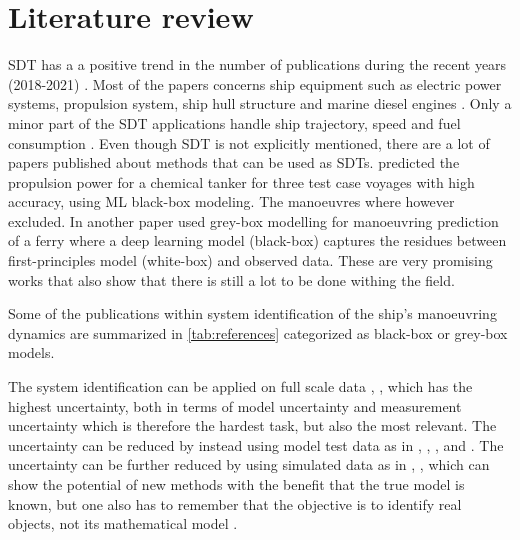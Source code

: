 

\section{Literature review}
SDT has a a positive trend in the number of publications during the recent years (2018-2021)  \cite{assani_ships_2022}. Most of the papers concerns ship equipment such as electric power systems, propulsion system, ship hull structure and marine diesel engines \cite{assani_ships_2022}. Only a minor part of the SDT applications handle ship trajectory, speed and fuel consumption \cite{assani_ships_2022}.   
Even though SDT is not explicitly mentioned, there are a lot of papers published about methods that can be used as SDTs. \cite{lang_comparison_2022} predicted the propulsion power for a chemical tanker for three test case voyages with high accuracy, using ML black-box modeling. The manoeuvres where however excluded. In another paper \cite{nielsen_machine_2022} used grey-box modelling for manoeuvring prediction of a ferry where a deep learning model (black-box) captures the residues between first-principles model (white-box) and observed data. These are very promising works that also show that there is still a lot to be done withing the field. 

Some of the publications within system identification of the ship's manoeuvring dynamics are summarized in \autoref{tab:references} categorized as black-box or grey-box models.
 
\noindent The system identification can be applied on full scale data \cite{astrom_identification_1976}, \cite{perera_system_2015}, \cite{revestido_herrero_two-step_2012} which has the highest uncertainty, both in terms of model uncertainty and measurement uncertainty which is therefore the hardest task, but also the most relevant. The uncertainty can be reduced by instead using model test data as in \cite{araki_estimating_2012}, \cite{he_nonparametric_2022}, \cite{xue_identification_2021}, \cite{miller_ship_2021} and \cite{luo_parameter_2016} . The uncertainty can be further reduced by using simulated data as in \cite{shi_identification_2009}, \cite{zhu_parameter_2017}, \cite{wang_parameter_2021} which can show the potential of new methods with the benefit that the true model is known, but one also has to remember that the objective is to identify real objects, not its mathematical model \cite{miller_ship_2021}.

